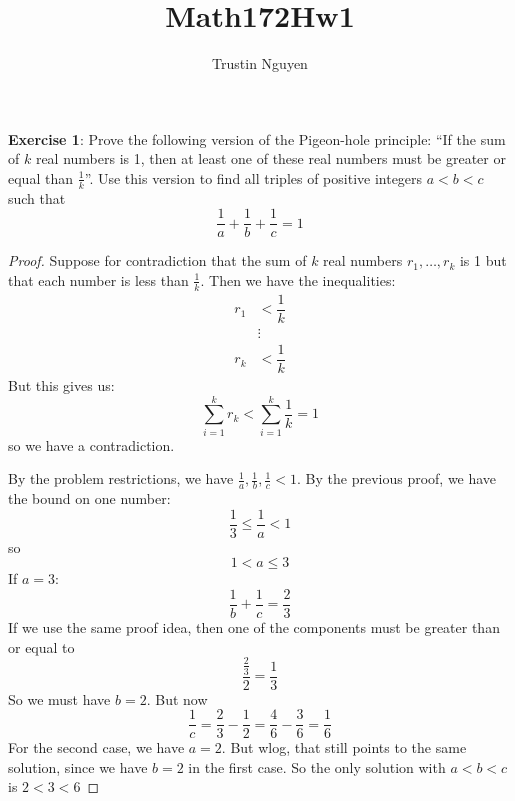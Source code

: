 \documentclass{article}
\title{Math172Hw1}
\author{Trustin Nguyen}
\begin{document}
\begin{titlepage}
    \maketitle
\end{titlepage}

\reversemarginpar

\textbf{Exercise 1}: Prove the following version of the Pigeon-hole principle: ``If the sum of $k$ real numbers is 1, then at least one of these real numbers must be greater or equal than $\frac{1}{k}$''. Use this version to find all triples of positive integers $a < b < c$ such that 
    \begin{equation*}
        \dfrac{1}{a} + \dfrac{1}{b} + \dfrac{1}{c} = 1
    \end{equation*}
    \begin{proof}
        Suppose for contradiction that the sum of $k$ real numbers $r_{1}, \ldots, r_{k}$ is 1 but that each number is less than $\frac{1}{k}$. Then we have the inequalities:
            \begin{align*}
                r_{1} &<      \dfrac{1}{k} \\
                      &\vdots              \\
                r_{k} &<      \dfrac{1}{k}   
            \end{align*}
        But this gives us:
            \begin{equation*}
                \sum_{i = 1}^{k} r_{k} <  \sum_{i = 1}^{k} \dfrac{1}{k} = 1
            \end{equation*}
        so we have a contradiction.

        By the problem restrictions, we have $\frac{1}{a}, \frac{1}{b}, \frac{1}{c} < 1$. By the previous proof, we have the bound on one number:
            \begin{equation*}
                \dfrac{1}{3} \leq \frac{1}{a} < 1
            \end{equation*}
        so
            \begin{equation*}
                1 < a \leq 3
            \end{equation*}
        If $a = 3$:
            \begin{equation*}
                \frac{1}{b} + \frac{1}{c} = \frac{2}{3}
            \end{equation*}
        If we use the same proof idea, then one of the components must be greater than or equal to 
            \begin{equation*}
                \dfrac{\frac{2}{3}}{2} = \frac{1}{3}
            \end{equation*}
        So we must have $b = 2$. But now 
            \begin{equation*}
                \frac{1}{c} = \dfrac{2}{3} - \dfrac{1}{2} = \dfrac{4}{6} - \dfrac{3}{6} = \dfrac{1}{6}
            \end{equation*}
        For the second case, we have $a = 2$. But wlog, that still points to the same solution, since we have $b = 2$ in the first case. So the only solution with $a < b < c$ is $2 < 3 < 6$
    \end{proof}
\end{document}
